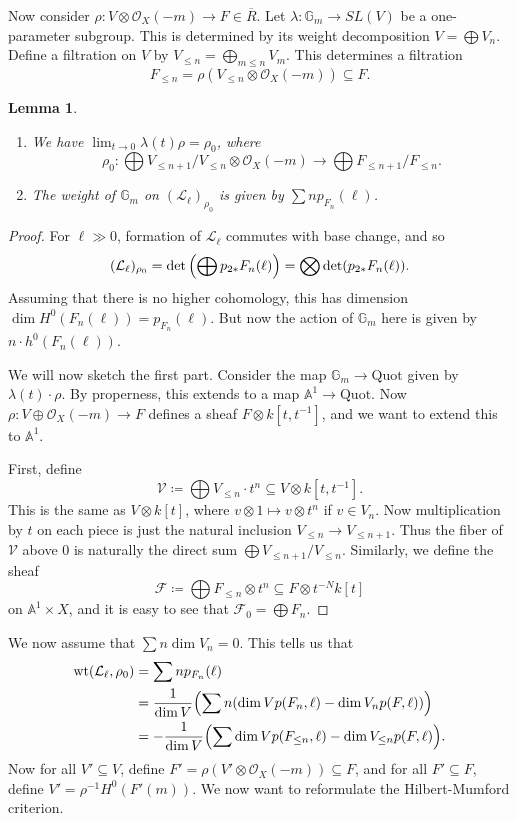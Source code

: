 \documentclass[leqno, openany]{memoir}
\newtheorem{lem}[thm]{Lemma}
\theoremstyle{definition}
\theoremstyle{remark}
\theoremstyle{plain}
\theoremstyle{definition}
\theoremstyle{remark}
\newcommand{\A}{\mathbb{A}}
\newcommand{\mc}[1]{\mathcal{#1}}
\newcommand{\mr}[1]{\mathrm{#1}}
\newcommand{\ol}[1]{\overline{#1}}
\begin{document}
Now consider $\rho \colon V \otimes \mc{O}_X(-m) \to F \in \ol{R}$. Let $\lambda \colon \mathbb{G}_m \to SL(V)$ be a one-parameter subgroup. This is determined by its weight decomposition $V = \bigoplus V_n$. Define a filtration on $V$ by $V_{\leq n} = \bigoplus_{m \leq n} V_m$. This determines a filtration 
\[ F_{\leq n} = \rho(V_{\leq n} \otimes \mc{O}_X(-m)) \subseteq F. \]
\begin{lem}\leavevmode
    \begin{enumerate}
        \item We have $\lim_{t \to 0} \lambda(t) \rho = \rho_0$, where 
            \[ \rho_0 \colon \bigoplus V_{\leq n+1} / V_{\leq n} \otimes \mc{O}_X(-m) \to \bigoplus F_{\leq n+1} / F_{\leq n}. \]
        \item The weight of $\mathbb{G}_m$ on $(\mc{L}_{\ell})_{\rho_0}$ is given by $\sum n p_{F_n}(\ell)$.
    \end{enumerate}
\end{lem}

\begin{proof}
    For $\ell \gg 0$, formation of $\mc{L}_{\ell}$ commutes with base change, and so
    \[ (\mc{L}_{\ell})_{\rho_0} = \det \qty( \bigoplus p_{2*} F_n(\ell)) = \bigotimes \det (p_{2*} F_n(\ell)). \]
    Assuming that there is no higher cohomology, this has dimension  $\dim H^0(F_n(\ell)) = p_{F_n}(\ell)$. But now the action of $\mathbb{G}_m$ here is given by $n \cdot h^0(F_n(\ell))$.

    We will now sketch the first part. Consider the map $\mathbb{G}_m \to \mr{Quot}$ given by $\lambda(t) \cdot \rho$. By properness, this extends to a map $\A^1 \to \mr{Quot}$. Now $\rho \colon V \oplus \mc{O}_X(-m) \to F$ defines a sheaf $F \otimes k[t, t^{-1}]$, and we want to extend this to $\A^1$.

    First, define
    \[ \mc{V} \coloneqq \bigoplus V_{\leq n} \cdot t^n \subseteq V \otimes k[t, t^{-1}]. \]
    This is the same as $V \otimes k[t]$, where $v \otimes 1 \mapsto v \otimes t^n$ if $v \in V_n$. Now multiplication by $t$ on each piece is just the natural inclusion $V_{\leq n} \to V_{\leq n+1}$. Thus the fiber of $\mc{V}$ above $0$ is naturally the direct sum $\bigoplus V_{\leq n+1} / V_{\leq n}$. Similarly, we define the sheaf
    \[ \mc{F} \coloneqq \bigoplus F_{\leq n} \otimes t^n \subseteq F \otimes t^{-N} k[t] \]
    on $\A^1 \times X$, and it is easy to see that $\mc{F}_0 = \bigoplus F_n$.
\end{proof}

We now assume that $\sum n \dim V_n = 0$. This tells us that
\begin{align*}
    \mr{wt}(\mc{L}_{\ell}, \rho_0) &= \sum n p_{F_n}(\ell) \\
    &= \frac{1}{\dim V} \qty(\sum n (\dim V p(F_n, \ell) - \dim V_n p(F, \ell))) \\
    &= - \frac{1}{\dim V} \qty(\sum \dim V p(F_{\leq n}, \ell) - \dim V_{\leq n} p(F, \ell)).
\end{align*}
Now for all $V' \subseteq V$, define $F' = \rho(V' \otimes \mc{O}_X(-m)) \subseteq F$, and for all $F' \subseteq F$, define $V' = \rho^{-1} H^0(F'(m))$. We now want to reformulate the Hilbert-Mumford criterion.
\end{document}
